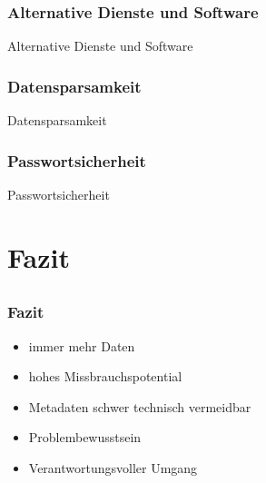 \documentclass[12pt]{beamer}
\begin{document}
\begin{frame}
  \frametitle{Alternative Dienste und Software}
  \begin{center}
	\large{Alternative Dienste und Software}
  \end{center}
\end{frame}

\begin{frame}
  \frametitle{Datensparsamkeit}
  \begin{center}
	\large{Datensparsamkeit}
  \end{center}
\end{frame}

\begin{frame}
  \frametitle{Passwortsicherheit}
  \begin{center}
	\large{Passwortsicherheit}
  \end{center}
\end{frame}

\section{Fazit}
\subsection{}

\begin{frame}
  \frametitle{Fazit}
  \begin{itemize}
    \item<2-> immer mehr Daten
    \item<3-> hohes Missbrauchspotential
    \item<4-> Metadaten schwer technisch vermeidbar
    \item<5-> Problembewusstsein
    \item<6-> Verantwortungsvoller Umgang
  \end{itemize}
\end{frame}
\end{document}
